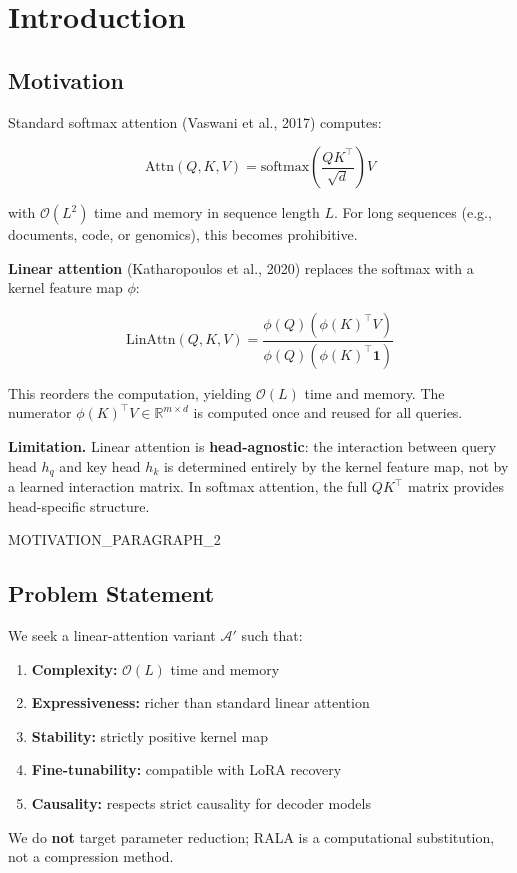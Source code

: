 
\section{Introduction}

\subsection{Motivation}

Standard softmax attention (Vaswani et al., 2017) computes:

\[
\text{Attn}(Q, K, V) = \text{softmax}\!\left(\frac{Q K^\top}{\sqrt{d}}\right) V
\tag{1.1}
\]

with $\mathcal{O}(L^2)$ time and memory in sequence length $L$. For long 
sequences (e.g., documents, code, or genomics), this becomes prohibitive.

\textbf{Linear attention} (Katharopoulos et al., 2020) replaces the softmax with 
a kernel feature map $\phi$:

\[
\text{LinAttn}(Q, K, V) = \frac{\phi(Q) \left(\phi(K)^\top V\right)}{\phi(Q) \left(\phi(K)^\top \mathbf{1}\right)}
\tag{1.2}
\]

This reorders the computation, yielding $\mathcal{O}(L)$ time and memory. 
The numerator $\phi(K)^\top V \in \mathbb{R}^{m \times d}$ is computed once 
and reused for all queries.

\textbf{Limitation.} Linear attention is \textbf{head-agnostic}: the interaction between 
query head $h_q$ and key head $h_k$ is determined entirely by the kernel 
feature map, not by a learned interaction matrix. In softmax attention, the 
full $QK^\top$ matrix provides head-specific structure.

{{MOTIVATION\_PARAGRAPH\_2}}


\subsection{Problem Statement}

We seek a linear-attention variant $\mathcal{A}'$ such that:

\begin{enumerate}
\item \textbf{Complexity:} $\mathcal{O}(L)$ time and memory
\item \textbf{Expressiveness:} richer than standard linear attention
\item \textbf{Stability:} strictly positive kernel map
\item \textbf{Fine-tunability:} compatible with LoRA recovery
\item \textbf{Causality:} respects strict causality for decoder models

\end{enumerate}
We do \textbf{not} target parameter reduction; RALA is a computational substitution, 
not a compression method.

